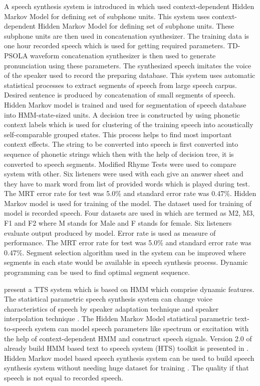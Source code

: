 A speech synthesis system is introduced in \cite{donovan1995improvements} which used context-dependent Hidden Markov Model
for defining set of subphone units. This system uses context-dependent Hidden Markov Model for defining set of subphone units. These subphone units are then used in concatenation synthesizer. The training data is one hour recorded speech which is used for getting required parameters. TD-PSOLA waveform concatenation synthesizer is then used to generate pronunciation using these parameters. The synthesized speech imitates the voice of the speaker used to record the preparing database. This system uses automatic statistical processes to extract segments of speech from large speech carpus. Desired sentence is produced by concatenation of small
segments of speech. Hidden Markov model is trained and used for segmentation of speech database into HMM-state-sized
units. A decision tree is constructed by using phonetic context labels which is used for clustering of the training speech into
acoustically self-comparable grouped states. This process helps to find most important context effects. The string to be
converted into speech is first converted into sequence of phonetic strings which then with the help of decision tree, it is
converted to speech segments. Modified Rhyme Tests \cite{house1965articulation} were used to compare system
with other. Six listeners were used with each give an answer sheet and they have to mark word from list of provided words
which is played during test. The MRT error rate for test was 5.0\% and standard error rate was 0.47\%. Hidden Markov model is used for training of the model. The dataset used for training of model is recorded speech. Four datasets are used in which are termed as M2, M3, F1 and F2 where M stands for Male and F stands for female. Six listeners evaluate output produced by model. Error rate is used as measure of performance. 
The MRT error rate for test was 5.0\% and standard error rate was 0.47\%. Segment selection algorithm used in the system can be improved where segments in each state would be available in speech synthesis process. Dynamic programming can be used to find optimal segment sequence.

\cite{masuko1996speech} present a TTS system which is based on HMM which comprise dynamic features. The statistical parametric speech synthesis system can change voice characteristics of speech by speaker adaptation technique \cite{tamura1998speaker} and speaker interpolation technique \cite{yoshimura2001speaker}. The Hidden Markov Model statistical parametric text-to-speech system can model speech parameters like spectrum or excitation with the help of context-dependent HMM and construct speech signals. Version 2.0 of already build HMM based text to speech system (HTS) toolkit is presented in \cite{zen2007hmm}. Hidden Markov model based speech synthesis system can be used to build speech synthesis system without needing huge dataset for training \cite{huang2001spoken}. The quality if that speech is not equal to recorded speech. 

